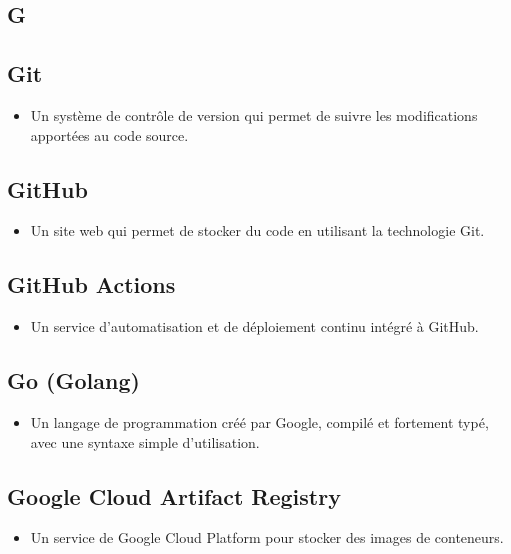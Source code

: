 \begin{multicols}{2}
    \section*{G}

    \subsection*{Git}
    \begin{itemize}
        \item Un système de contrôle de version qui permet de suivre les modifications apportées au code source.
    \end{itemize}

    \subsection*{GitHub}
    \begin{itemize}
        \item Un site web qui permet de stocker du code en utilisant la technologie Git.
    \end{itemize}

    \subsection*{GitHub Actions}
    \begin{itemize}
        \item Un service d'automatisation et de déploiement continu intégré à GitHub.
    \end{itemize}

    \subsection*{Go (Golang)}
    \begin{itemize}
        \item Un langage de programmation créé par Google, compilé et fortement typé, avec une syntaxe simple d'utilisation.
    \end{itemize}

    \subsection*{Google Cloud Artifact Registry}
    \begin{itemize}
        \item Un service de Google Cloud Platform pour stocker des images de conteneurs.
    \end{itemize}


\end{multicols}
